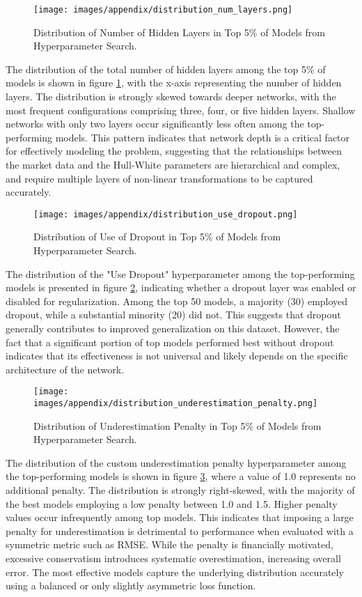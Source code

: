 \begin{figure}[H]
	\centering
	\texttt{[image: images/appendix/distribution\_num\_layers.png]}
	\caption{Distribution of Number of Hidden Layers in Top 5\% of Models from Hyperparameter Search.}
	\label{fig:distribution_num_layers}
\end{figure}
The distribution of the total number of hidden layers among the top 5\% of models is shown in figure \ref{fig:distribution_num_layers}, with the x-axis representing the number of hidden layers. The distribution is strongly skewed towards deeper networks, with the most frequent configurations comprising three, four, or five hidden layers. Shallow networks with only two layers occur significantly less often among the top-performing models. This pattern indicates that network depth is a critical factor for effectively modeling the problem, suggesting that the relationships between the market data and the Hull-White parameters are hierarchical and complex, and require multiple layers of non-linear transformations to be captured accurately.

\begin{figure}[H]
	\centering
	\texttt{[image: images/appendix/distribution\_use\_dropout.png]}
	\caption{Distribution of Use of Dropout in Top 5\% of Models from Hyperparameter Search.}
	\label{fig:distribution_use_dropout}
\end{figure}
The distribution of the "Use Dropout" hyperparameter among the top-performing models is presented in figure \ref{fig:distribution_use_dropout}, indicating whether a dropout layer was enabled or disabled for regularization. Among the top 50 models, a majority (30) employed dropout, while a substantial minority (20) did not. This suggests that dropout generally contributes to improved generalization on this dataset. However, the fact that a significant portion of top models performed best without dropout indicates that its effectiveness is not universal and likely depends on the specific architecture of the network.

\begin{figure}[H]
	\centering
	\texttt{[image: images/appendix/distribution\_underestimation\_penalty.png]}
	\caption{Distribution of Underestimation Penalty in Top 5\% of Models from Hyperparameter Search.}
	\label{fig:distribution_underestimation_penalty}
\end{figure}
The distribution of the custom underestimation penalty hyperparameter among the top-performing models is shown in figure \ref{fig:distribution_underestimation_penalty}, where a value of 1.0 represents no additional penalty. The distribution is strongly right-skewed, with the majority of the best models employing a low penalty between 1.0 and 1.5. Higher penalty values occur infrequently among top models. This indicates that imposing a large penalty for underestimation is detrimental to performance when evaluated with a symmetric metric such as RMSE. While the penalty is financially motivated, excessive conservatism introduces systematic overestimation, increasing overall error. The most effective models capture the underlying distribution accurately using a balanced or only slightly asymmetric loss function.

